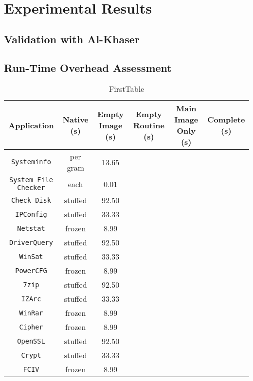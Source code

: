 
\chapter{Experimental Results}

\lipsum[23]

\section{Validation with Al-Khaser}

\section{Run-Time Overhead Assessment}

\vspace*{0.8cm}
\begin{sidewaystable}
\centering
\begin{tabular}{cccccc}
\hline
\hline
\cline{1-2}
   \textbf{Application} & \textbf{Native (s)} & \textbf{Empty Image (s)} & \textbf{Empty Routine (s)} & \textbf{Main Image Only (s)} & \textbf{Complete (s)} \\
\hline
\texttt{Systeminfo}      & per gram    & 13.65      \\
\texttt{System File Checker}          & each        & 0.01       \\
\texttt{Check Disk}       & stuffed     & 92.50      \\
\texttt{IPConfig}       & stuffed     & 33.33      \\
\texttt{Netstat} & frozen      & 8.99       \\
\texttt{DriverQuery}       & stuffed     & 92.50      \\
\texttt{WinSat}       & stuffed     & 33.33      \\
\texttt{PowerCFG} & frozen      & 8.99       \\
\texttt{7zip}       & stuffed     & 92.50      \\
\texttt{IZArc}      & stuffed     & 33.33      \\
\texttt{WinRar} & frozen      & 8.99       \\
\texttt{Cipher} & frozen      & 8.99       \\
\texttt{OpenSSL}       & stuffed     & 92.50      \\
\texttt{Crypt}      & stuffed     & 33.33      \\
\texttt{FCIV} & frozen      & 8.99       \\
\hline
\end{tabular}
\vspace{0.2cm}
\caption{FirstTable}

\end{sidewaystable}


